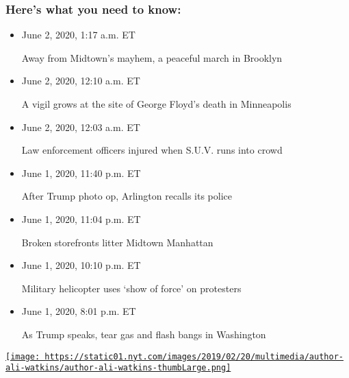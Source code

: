 \hypertarget{heres-what-you-need-to-know}{%
\subsubsection{Here's what you need to
know:}\label{heres-what-you-need-to-know}}

\begin{itemize}
\item
  June 2, 2020, 1:17 a.m. ET

  \protect\hyperlink{away-from-midtowns-mayhem-a-peaceful-march-in-brooklyn}{}

  Away from Midtown's mayhem, a peaceful march in Brooklyn
\item
  June 2, 2020, 12:10 a.m. ET

  \protect\hyperlink{a-vigil-grows-at-the-site-of-george-floyds-death-in-minneapolis}{}

  A vigil grows at the site of George Floyd's death in Minneapolis
\item
  June 2, 2020, 12:03 a.m. ET

  \protect\hyperlink{law-enforcement-officers-injured-when-suv-runs-into-crowd}{}

  Law enforcement officers injured when S.U.V. runs into crowd
\item
  June 1, 2020, 11:40 p.m. ET

  \protect\hyperlink{after-trump-photo-op-arlington-recalls-its-police}{}

  After Trump photo op, Arlington recalls its police
\item
  June 1, 2020, 11:04 p.m. ET

  \protect\hyperlink{broken-storefronts-litter-midtown-manhattan}{}

  Broken storefronts litter Midtown Manhattan
\item
  June 1, 2020, 10:10 p.m. ET

  \protect\hyperlink{military-helicopter-uses-show-of-force-on-protesters}{}

  Military helicopter uses `show of force' on protesters
\item
  June 1, 2020, 8:01 p.m. ET

  \protect\hyperlink{as-trump-speaks-tear-gas-and-flash-bangs-in-washington}{}

  As Trump speaks, tear gas and flash bangs in Washington
\end{itemize}

\href{https://www.nytimes.com/by/ali-watkins}{\texttt{[image: https://static01.nyt.com/images/2019/02/20/multimedia/author-ali-watkins/author-ali-watkins-thumbLarge.png]}}


